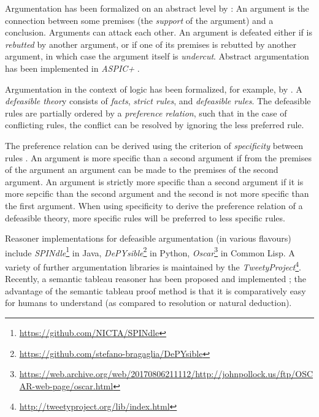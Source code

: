 Argumentation has been formalized on an abstract level by \citet{dungAcceptabilityArgumentsIts1995}: An argument is the connection between some premises (the \textit{support} of the argument) and a conclusion. Arguments can attack each other. An argument is defeated either if is \textit{rebutted} by another argument, or if one of its premises is rebutted by another argument, in which case the argument itself is \textit{undercut}. Abstract argumentation has been implemented in \textit{ASPIC+} \citep{modgilASPICFrameworkStructured2014}. 

Argumentation in the context of logic has been formalized, for example, by \citet{roosResolvingConflictsArguments2000}. A \textit{defeasible theor}y consists of \textit{facts}, \textit{strict rules}, and \textit{defeasible rules}. The defeasible rules are partially ordered by a \textit{preference relation}, such that in the case of conflicting rules, the conflict can be resolved by ignoring the less preferred rule. 

The preference relation can be derived using the criterion of \textit{specificity} between rules \citep[def.~4]{roosResolvingConflictsArguments2000}. An argument is more specific than a second argument if from the premises of the argument an argument can be made to the premises of the second argument. An argument is strictly more specific than a second argument if it is more sepcific than the second argument and the second is not more specific than the first argument. When using specificity to derive the preference relation of a defeasible theory, more specific rules will be preferred to less specific rules. 

Reasoner implementations for defeasible argumentation (in various flavours) include \textit{SPINdle}\footnote{\url{https://github.com/NICTA/SPINdle}} in Java, \textit{DePYsible}\footnote{\url{https://github.com/stefano-bragaglia/DePYsible}} in Python, \textit{Oscar}\footnote{\url{https://web.archive.org/web/20170806211112/http://johnpollock.us/ftp/OSCAR-web-page/oscar.html}} in Common Lisp. A variety of further argumentation libraries is maintained by the \textit{TweetyProject}\footnote{\url{http://tweetyproject.org/lib/index.html}}. Recently, a semantic tableau reasoner has been proposed \citep{roosSemanticTableauMethod2020} and implemented \citep{barbarafutymaExplainableAIArguments2021}; the advantage of the semantic tableau proof method is that it is comparatively easy for humans to understand (as compared to resolution or natural deduction).

